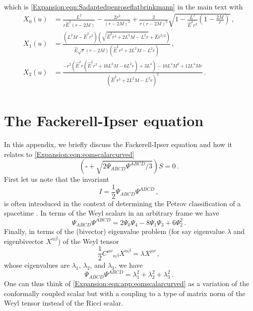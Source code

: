 	which is \eqref{Expansion:eqn:Sadaptedpenroseflatbrinkmann} in the main text with
	\begin{equation}
	\begin{aligned}
	X_0(u)  &= \frac{L^2}{r \hat{E}^2(r-2M)}- \frac{2 r^2}{(r-2M)^2}+  \frac{2}{r (r-2M)^2}\sqrt{ 1-\frac{L^2}{\hat{E}^2 r^2}\left(1-\frac{2M}{r}\right)} \, ,\\
	X_1(u)  &= \frac{\left(L^2 M-\hat{E}^2 r^3\right) \left(\sqrt{\hat{E}^2 r^3+2 L^2 M-L^2
			r}+\hat{E} r^{3/2}\right)}{\hat{E} \sqrt{r} (r-2 M) \left(\hat{E}^2 r^3+2 L^2
		M-L^2 r\right)} \, ,\\
	X_2(u)  &= \frac{-r^2 \left(\hat{E}^2 r \left(\hat{E}^2 r^3+16 L^2 M-6 L^2 r\right)+3
		L^4\right)-10 L^4 M^2+12 L^4 M r}{\left(\hat{E}^2 r^3+2 L^2 M-L^2 r\right)^2} \, .\\
	\end{aligned}
	\end{equation}
	
	\chapter{The Fackerell-Ipser equation}\label{Expansion:app:FIequation}
	
	In this appendix, we briefly discuss the Fackerell-Ipser equation and how it relates to \eqref{Expansion:eqn:eomscalarcurved}
	\begin{equation}\label{Expansion:eqn:app:eomscalarcurved}
	\left(\square  +  \sqrt{2 \Psi_{ABCD} \Psi^{ABCD}/3}\right) S = 0\, .
	\end{equation}
	First let us note that the invariant
	\begin{equation}
	I = \frac{1}{2}\Psi_{ABCD} \Psi^{ABCD} \, , 
	\end{equation}
	is often introduced in the context of determining the Petrov classification of a spacetime \cite{Stephani:2003tm}. In terms of the Weyl scalars in an arbitrary frame we have
	\begin{equation}\label{Expansion:eqn:IinWeyl}
	\Psi_{ABCD} \Psi^{ABCD} = 2\Psi_0 \Psi_4 - 8\Psi_1 \Psi_3 + 6 \Psi_2^2 \, .
	\end{equation}
	Finally, in terms of the (bivector) eigenvalue problem (for say eigenvalue $\lambda$ and eigenbivector $X^{\alpha \beta}$) of the Weyl tensor
	\begin{equation}
	\frac{1}{2}C^{\mu \nu}{}_{\alpha \beta} X^{\alpha \beta} = \lambda X^{\mu \nu} \, ,
	\end{equation}
	whose eigenvalues are $\lambda_1$, $\lambda_2$, and $\lambda_3$, we have
	\begin{equation}
	\Psi_{ABCD} \Psi^{ABCD} = \lambda_1^2 + \lambda^2_2 + \lambda_3^2 \, .
	\end{equation}
	One can thus think of \eqref{Expansion:eqn:app:eomscalarcurved} as a variation of the conformally coupled scalar but with a coupling to a type of matrix norm of the Weyl tensor instead of the Ricci scalar. 
	
